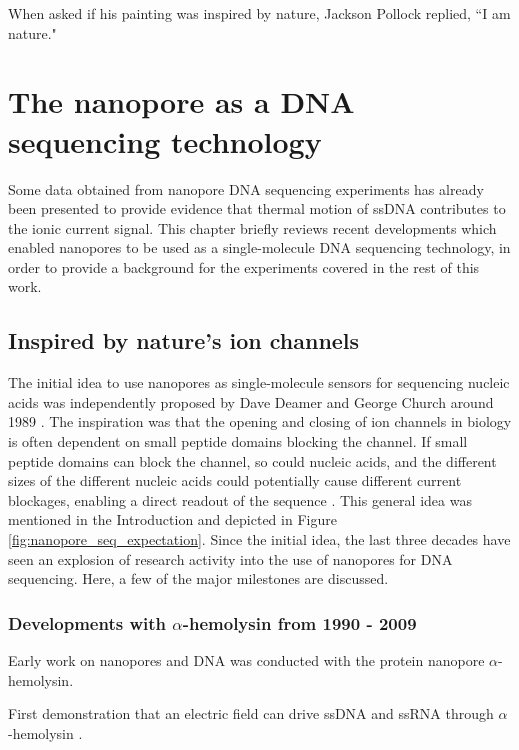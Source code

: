 \begin{savequote}[75mm]
When asked if his painting was inspired by nature, Jackson Pollock replied, ``I am nature."
\end{savequote}

\chapter{The nanopore as a DNA sequencing technology}
\label{dna_sequencing}

Some data obtained from nanopore DNA sequencing experiments has already been presented to provide evidence that thermal motion of ssDNA contributes to the ionic current signal.  This chapter briefly reviews recent developments which enabled nanopores to be used as a single-molecule DNA sequencing technology, in order to provide a background for the experiments covered in the rest of this work.

\section{Inspired by nature's ion channels}

The initial idea to use nanopores as single-molecule sensors for sequencing nucleic acids was independently proposed by Dave Deamer and George Church around 1989 \citep{Deamer2016,Branton2008}.  The inspiration was that the opening and closing of ion channels in biology is often dependent on small peptide domains blocking the channel.  If small peptide domains can block the channel, so could nucleic acids, and the different sizes of the different nucleic acids could potentially cause different current blockages, enabling a direct readout of the sequence \citep{Branton2008}.  This general idea was mentioned in the Introduction and depicted in Figure \ref{fig:nanopore_seq_expectation}.  Since the initial idea, the last three decades have seen an explosion of research activity into the use of nanopores for DNA sequencing.  Here, a few of the major milestones are discussed.

\subsection{Developments with $\alpha$-hemolysin from 1990 - 2009}

Early work on nanopores and DNA was conducted with the protein nanopore $\alpha$-hemolysin.

First demonstration that an electric field can drive ssDNA and ssRNA through $\alpha$-hemolysin \citep{Kasianowicz1996}.

